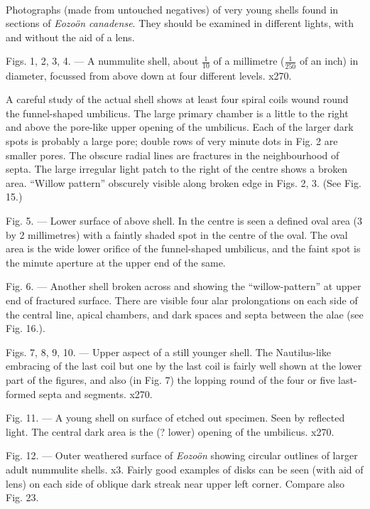 \documentclass[a4paper, 12pt, oneside]{article}
\begin{document}
\paragraph{}
Photographs (made from untouched negatives) of very young shells found in sections of \emph{Eozoön canadense}. They should be examined in different lights, with and without the aid of a lens.

Figs. 1, 2, 3, 4. --- A nummulite shell, about $\frac{1}{10}$ of a millimetre ($\frac{1}{250}$ of an inch) in diameter, focussed from above down at four different levels. x270.

A careful study of the actual shell shows at least four spiral coils wound round the funnel-shaped umbilicus. The large primary chamber is a little to the right and above the pore-like upper opening of the umbilicus. Each of the larger dark spots is probably a large pore; double rows of very minute dots in Fig. 2 are smaller pores. The obscure radial lines are fractures in the neighbourhood of septa. The large irregular light patch to the right of the centre shows a broken area. ``Willow pattern'' obscurely visible along broken edge in Figs. 2, 3. (See Fig. 15.)

Fig. 5. --- Lower surface of above shell. In the centre is seen a defined oval area (3 by 2 millimetres) with a faintly shaded spot in the centre of the oval. The oval area is the wide lower orifice of the funnel-shaped umbilicus, and the faint spot is the minute aperture at the upper end of the same.

Fig. 6. --- Another shell broken across and showing the ``willow-pattern'' at upper end of fractured surface. There are visible four alar prolongations on each side of the central line, apical chambers, and dark spaces and septa between the alae (see Fig. 16.).

Figs. 7, 8, 9, 10. --- Upper aspect of a still younger shell. The Nautilus-like embracing of the last coil but one by the last coil is fairly well shown at the lower part of the figures, and also (in Fig. 7) the lopping round of the four or five last-formed septa and segments. x270.

Fig. 11. --- A young shell on surface of etched out specimen. Seen by reflected light. The central dark area is the (? lower) opening of the umbilicus. x270.

Fig. 12. --- Outer weathered surface of \emph{Eozoön} showing circular outlines of larger adult nummulite shells. x3. Fairly good examples of disks can be seen (with aid of lens) on each side of oblique dark streak near upper left corner. Compare also Fig. 23.
\end{document}
